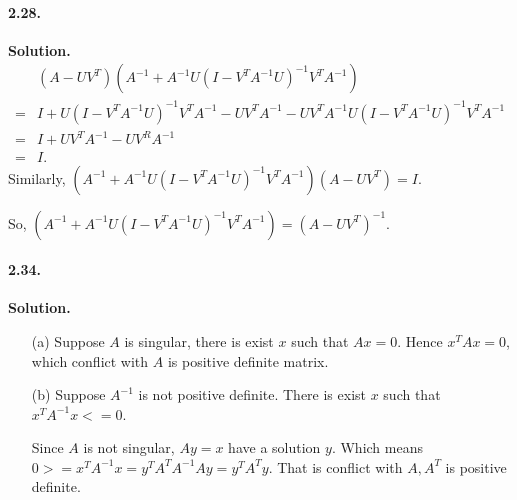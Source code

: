 \documentclass[a4paper]{book}
\newenvironment{solution}%
{\noindent\textbf{Solution.}}%
{\qedhere}
\numberwithin{equation}{chapter}
\theoremstyle{definition}
\begin{document}
\paragraph*{2.28. }
\begin{solution}
    \begin{align*}
          & (A - UV^T)(A^{-1} +A^{-1}U(I - V^T A^{-1} U)^{-1} V^T A^{-1})                                   \\
        = & I + U(I - V^T A^{-1}U)^{-1}V^TA^{-1} -UV^TA^{-1} -UV^TA^{-1}U(I - V^T A^{-1} U)^{-1} V^T A^{-1} \\
        = & I + UV^TA^{-1} - UV^RA^{-1}                                                                     \\
        = & I.
    \end{align*}
    Similarly, $(A^{-1} +A^{-1}U(I - V^T A^{-1} U)^{-1} V^T A^{-1})(A -UV^T) = I$.

    So, $(A^{-1} +A^{-1}U(I - V^T A^{-1} U)^{-1} V^T A^{-1}) = (A - UV^T)^{-1}$.
\end{solution}

\paragraph*{2.34. }
\begin{solution}
    \begin{itemize}
        \item [(a)] Suppose $\mathit{A}$ is singular, there is exist
              $x$ such that $Ax = 0$. Hence $x^TAx = 0$, which conflict
              with $\mathit{A}$ is positive definite matrix.

        \item [(b)] Suppose $\mathit{A}^{-1}$ is not positive definite.
              There is exist $x$ such that $x^T A^{-1} x <= 0$.

              Since $\mathit{A}$ is not singular, $Ay = x$ have a solution $y$.
              Which means $0 >= x^T A^{-1} x = y^T A^T A^{-1} A y = y^T A^T y$.
              That is conflict with $A, A^T$ is positive definite.
    \end{itemize}
\end{solution}
\end{document}
